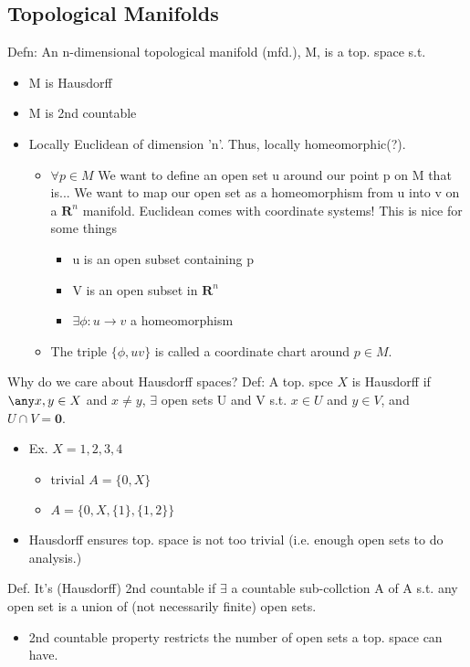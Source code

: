 \documentclass[12pt,letterpaper]{article}
\begin{document}
\subsection{Topological Manifolds}
Defn: An n-dimensional topological manifold (mfd.), M, is a top. space s.t. 
\begin{itemize}
    \item M is Hausdorff
    \item M is 2nd countable
    \item Locally Euclidean of dimension 'n'. Thus, locally homeomorphic(?).
    \begin{itemize}
        \item $\forall p \in M$ We want to define an open set u around our point p on M that is... We want to map our open set as a homeomorphism from u into v on a $\mathbf{R}^n$ manifold. Euclidean comes with coordinate systems! This is nice for some things
        \begin{itemize}
            \item u is an open subset containing p
            \item V is an open subset in $\mathbf{R}^n$
            \item $\exists \phi : u \rightarrow v$ a homeomorphism
        \end{itemize}
        \item The triple $\{\phi, u v\}$ is called a coordinate chart around $p \in M$.
        
    \end{itemize}
\end{itemize}

Why do we care about Hausdorff spaces? Def: A top. spce $X$ is Hausdorff if $\any x, y \in X$ and $x \neq y$, $\exists$ open sets U and V s.t. $x \in U$ and $y \in V$, and $U \cap V = \mathbf{0}$. 
\begin{itemize}
    \item Ex. $X = {1,2,3,4} $
    \begin{itemize}
        \item trivial $A = \{0,X\}$
        \item $A = \{0, X, \{1\}, \{1,2\}\}$
        
    \end{itemize}
    \item Hausdorff ensures top. space is not too trivial (i.e. enough open sets to do analysis.)
\end{itemize}

Def. It's (Hausdorff) 2nd countable if $\exists$ a countable sub-collction A of A s.t. any open set is a union of (not necessarily finite) open sets. 
\begin{itemize}
    \item 2nd countable property restricts the number of open sets a top. space can have. 
\end{itemize}
\end{document}
